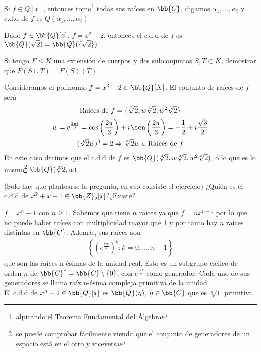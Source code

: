 \begin{observacion}
    Si $f\in Q[x]$, entonces tomo\footnote{alpicando el Teorema Fundamental del Álgebra} todas sus raíces en $\bb{C}$, digamos $\alpha_1, \dots, \alpha_t$ y c.d.d de $f$ es $Q(\alpha_1, \dots, \alpha_t)$
\end{observacion}

\begin{ejemplo}
    Dado $f\in \bb{Q}[x]$, $f=x^2-2$, entonces el c.d.d de $f$ es $\bb{Q}(\sqrt{2}) = \bb{Q}(\{\sqrt{2}\})$
\end{ejemplo}

\begin{ejercicio}
    Si tengo $F\leq K$ una extensión de cuerpos y dos subconjuntos $S,T\subset K$, demostrar que $F(S\cup T) = F(S)(T)$
\end{ejercicio}

\begin{ejemplo}
    Consideramos el polinomio $f=x^3-2 \in \bb{Q}[X]$. El conjunto de raíces de $f$ será
    \begin{gather*}
        \text{Raíces de }f = \{\sqrt[3]{2}, w\sqrt[3]{2}, w^2\sqrt[3]{2}\}\\
        w = e^{\frac{2\pi i}{3}} = \cos\left(\frac{2\pi}{3}\right) + i\sen\left(\frac{2\pi}{3}\right) = -\frac{1}{2} + i \frac{\sqrt{3}}{2}\\
        (\sqrt[3]{2} w)^3 = 2 \Rightarrow \sqrt[3]{2} w \in \text{Raíces de }f
    \end{gather*}
    En este caso decimos que el c.d.d de $f$ es $\bb{Q}(\sqrt[3]{2}, w\sqrt[3]{2}, w^2\sqrt[3]{2})$, o lo que es lo mismo\footnote{se puede comprobar fácilmente viendo que el conjunto de generadores de un espacio está en el otro y viceversa} $\bb{Q}(\sqrt[3]{2}, w)$
\end{ejemplo}

\begin{ejercicio}(Solo hay que plantearse la pregunta, en eso consiste el ejercicio)
    ¿Quién es el c.d.d de $x^2+ x +1 \in \bb{Z}_2[x]$?¿Existe?
\end{ejercicio}

\begin{ejemplo}
    $f=x^n-1$ con $n\geq1$. Sabemos que tiene $n$ raíces ya que $f=nx^{n-1}$ por lo que no puede haber raíces con multiplicidad mayor que 1 y por tanto hay $n$ raíces distintas en $\bb{C}$. Además, sus raíces son
    \begin{gather*}
        \left\{\left(e^{\frac{i2\pi}{n}}\right)^k : k=0,\dots,n-1\right\}
    \end{gather*}
    que son las raíces n-ésimas de la unidad real. Esto es un subgrupo cíclico de orden $n$ de $\bb{C}^* = \bb{C}\setminus \{0\}$, con $e^{\frac{i 2\pi}{n}}$ como generador. Cada uno de sus generadores se llama raíz n-ésima compleja primitiva de la unidad.\\

    El c.d.d de $x^n-1\in \bb{Q}[x]$ es $\bb{Q}(\eta)$, $\eta\in \bb{C}$ que es $\sqrt[n]{1}$ primitiva.
\end{ejemplo}

